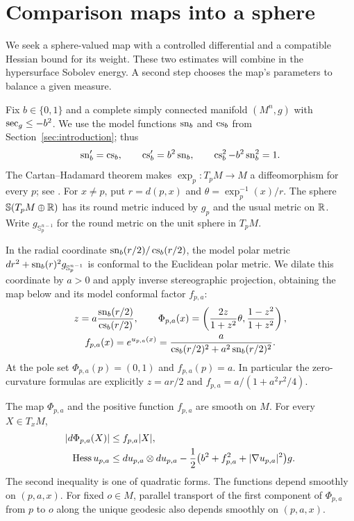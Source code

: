 \section{Comparison maps into a sphere}
\label{sec:maps}

We seek a sphere-valued map with a controlled differential and a
compatible Hessian bound for its weight. These two estimates will combine
in the hypersurface Sobolev energy. A second step chooses the map's
parameters to balance a given measure.

Fix $b\in\{0,1\}$ and a complete simply connected manifold $(M^n,g)$
with $\operatorname{sec}_g\le-b^2$. We use the model functions $\operatorname{sn}_b$ and $\operatorname{cs}_b$
from Section~\ref{sec:introduction}; thus
\[
 \operatorname{sn}_b'=\operatorname{cs}_b,\qquad \operatorname{cs}_b'=b^2\operatorname{sn}_b,
 \qquad \operatorname{cs}_b^2-b^2\operatorname{sn}_b^2=1.
\]
The Cartan--Hadamard theorem makes $\exp_p:T_pM\to M$ a diffeomorphism
for every $p$; see \cite[Theorem~6.2.2]{PetersenManuscript}.
For $x\ne p$, put $r=d(p,x)$ and $\theta=\exp_p^{-1}(x)/r$.
The sphere $\mathbb S(T_pM\oplus\mathbb R)$ has its round metric induced by
$g_p$ and the usual metric on $\mathbb R$.
Write $g_{\mathbb S_p^{n-1}}$ for the round metric on the unit sphere
in $T_pM$.

In the radial coordinate $\operatorname{sn}_b(r/2)/\operatorname{cs}_b(r/2)$, the model polar
metric $dr^2+\operatorname{sn}_b(r)^2g_{\mathbb S_p^{n-1}}$ is conformal to the
Euclidean polar metric. We dilate this coordinate by $a>0$ and apply
inverse stereographic projection, obtaining the map below and its model
conformal factor $f_{p,a}$:
\begin{equation}\label{eq:map-definition}
 \begin{gathered}
 z=a\frac{\operatorname{sn}_b(r/2)}{\operatorname{cs}_b(r/2)},\qquad
 \Phi_{p,a}(x)=\left(\frac{2z}{1+z^2}\theta,
                          \frac{1-z^2}{1+z^2}\right),\\
 f_{p,a}(x)=e^{u_{p,a}(x)}
 =\frac{a}{\operatorname{cs}_b(r/2)^2+a^2\operatorname{sn}_b(r/2)^2}.
 \end{gathered}
\end{equation}
At the pole set $\Phi_{p,a}(p)=(0,1)$ and $f_{p,a}(p)=a$.
In particular the zero-curvature formulas are explicitly
$z=ar/2$ and $f_{p,a}=a/(1+a^2r^2/4)$.

\begin{lemma}\label{lem:comparison-maps}
The map $\Phi_{p,a}$ and the positive function $f_{p,a}$ are smooth on
$M$. For every $X\in T_xM$,
\begin{equation}\label{eq:map-comparison}
 \begin{aligned}
 |d\Phi_{p,a}(X)|&\le f_{p,a}|X|,\\
 \operatorname{Hess} u_{p,a}&\le du_{p,a}\otimes du_{p,a}
 -\frac12\bigl(b^2+f_{p,a}^2+|\nabla u_{p,a}|^2\bigr)g.
 \end{aligned}
\end{equation}
The second inequality is one of quadratic forms. The functions depend
smoothly on $(p,a,x)$. For fixed $o\in M$, parallel transport of the
first component of $\Phi_{p,a}$ from $p$ to $o$ along the unique geodesic
also depends smoothly on $(p,a,x)$.
\end{lemma}

